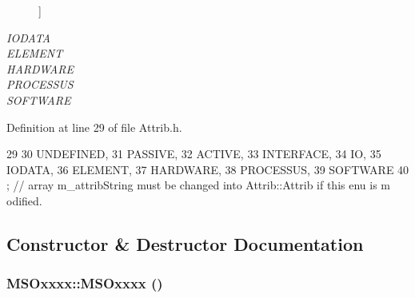 \begin{Desc}
\begin{description}
{}]\item[{\em 
\hypertarget{classAttrib_a69e171d7cc6417835a5a306d3c764235a0af3b0d0ac323c1704e6c69cf90add28}{
IODATA}
\label{classAttrib_a69e171d7cc6417835a5a306d3c764235a0af3b0d0ac323c1704e6c69cf90add28}
}]\item[{\em 
\hypertarget{classAttrib_a69e171d7cc6417835a5a306d3c764235a7788bc5dd333fd8ce18562b269c9dab1}{
ELEMENT}
\label{classAttrib_a69e171d7cc6417835a5a306d3c764235a7788bc5dd333fd8ce18562b269c9dab1}
}]\item[{\em 
\hypertarget{classAttrib_a69e171d7cc6417835a5a306d3c764235a61ceb22149f365f1780d18f9d1459423}{
HARDWARE}
\label{classAttrib_a69e171d7cc6417835a5a306d3c764235a61ceb22149f365f1780d18f9d1459423}
}]\item[{\em 
\hypertarget{classAttrib_a69e171d7cc6417835a5a306d3c764235a75250e29692496e73effca2c0330977f}{
PROCESSUS}
\label{classAttrib_a69e171d7cc6417835a5a306d3c764235a75250e29692496e73effca2c0330977f}
}]\item[{\em 
\hypertarget{classAttrib_a69e171d7cc6417835a5a306d3c764235a103a67cd0b8f07ef478fa45d4356e27b}{
SOFTWARE}
\label{classAttrib_a69e171d7cc6417835a5a306d3c764235a103a67cd0b8f07ef478fa45d4356e27b}
}]\end{description}
\end{Desc}



Definition at line 29 of file Attrib.h.


\begin{DoxyCode}
29                 {
30     UNDEFINED,
31     PASSIVE,
32     ACTIVE,
33     INTERFACE,
34     IO,
35     IODATA,
36     ELEMENT,
37     HARDWARE,
38     PROCESSUS,
39     SOFTWARE 
40   }; // array m_attribString must be changed into Attrib::Attrib if this enu is m
      odified. 
\end{DoxyCode}


\subsection{Constructor \& Destructor Documentation}
\hypertarget{classMSOxxxx_afa2d5e8dcabe88d8c4ef54238a4e7bc7}{
\subsubsection[{MSOxxxx}]{\setlength{\rightskip}{0pt plus 5cm}MSOxxxx::MSOxxxx ()}}
\label{classMSOxxxx_afa2d5e8dcabe88d8c4ef54238a4e7bc7}



